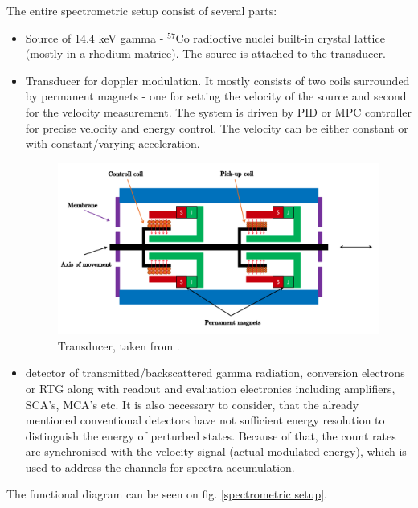 The entire spectrometric setup consist of several parts:
\begin{itemize}

\item Source of 14.4 keV gamma - $^{57}$Co radioctive nuclei built-in crystal lattice (mostly in a rhodium matrice). The source is attached to the transducer.
\item Transducer for doppler modulation. It mostly consists of two coils surrounded by permanent magnets - one for setting the velocity of the source and second for the velocity measurement. The system is driven by PID or MPC controller for precise velocity and energy control. The velocity can be either constant or with constant/varying acceleration.

\begin{figure}[H]
 \centering
 \includegraphics[scale=0.4, angle = 0]{./pictures/transducer}
 \caption{Transducer, taken from \cite{STEJSKAL2019thesis}.}
 \label{transducer}
 
\end{figure}

\item detector of transmitted/backscattered gamma radiation, conversion electrons or RTG along with readout and evaluation electronics including amplifiers, SCA's, MCA's etc. It is also necessary to consider, that the already mentioned conventional detectors have not sufficient energy resolution to distinguish the energy of perturbed states. Because of that, the count rates are synchronised with the velocity signal (actual modulated energy), which is used to address the channels for spectra accumulation. 

\end{itemize}
The functional diagram can be seen on fig. \ref{spectrometric setup}.


